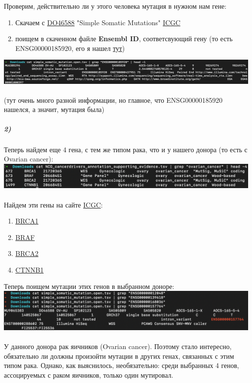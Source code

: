 \documentclass[12pt]{article}
\begin{document}
Проверим, действительно ли у этого человека мутация в нужном нам гене:
\begin{enumerate}
\setlength{\itemsep}{0pt}
    \item Скачаем с \href{https://dcc.icgc.org/donors/DO46588}{DO46588} "Simple Somatic Mutations" \href{https://dcc.icgc.org/genes/ENSG00000185920/mutations?mutations}{ICGC}
    \item поищем в скаченном файле \textbf{Ensembl ID}, соответсвующий гену (то есть ENSG00000185920, его я нашел \href{https://dcc.icgc.org/genes/ENSG00000185920}{тут})
\end{enumerate}
\includegraphics[width=\textwidth]{images/image7.png}\\\\
(тут очень много разной информации, но главное, что ENSG00000185920 нашелся, а значит, мутация была)
\pagebreak
\subparagraph{2)}
Теперь найдем еще 4 гена, с тем же типом рака, что и у нашего донора (то есть с Ovarian cancer):\\
\includegraphics[width=\textwidth]{images/image8.png}\\\\
Найдем эти гены на сайте \href{https://dcc.icgc.org}{ICGC}:
\begin{enumerate}
    \item \href{https://dcc.icgc.org/genes/ENSG00000012048}{BRCA1}
    \item \href{https://dcc.icgc.org/genes/ENSG00000157764}{BRAF}
    \item \href{https://dcc.icgc.org/genes/ENSG00000139618}{BRCA2}
    \item \href{https://dcc.icgc.org/genes/ENSG00000168036}{CTNNB1}

\end{enumerate}
Теперь поищем мутации этих генов в выбранном доноре:\\
\includegraphics[width=\textwidth]{images/image9.png}\\\\
У данного донора рак яичников (Ovarian cancer). Поэтому стало интересно, обязательно ли должны произойти мутации в других генах, связанных с этим типом рака. Однако, как выяснилось, необязательно: среди выбранных 4 генов, ассоцируемых с раком яичников, только один мутировал.
\end{document}

